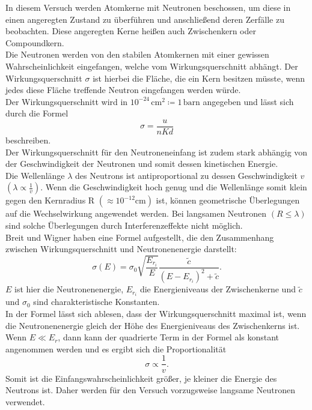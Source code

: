 In diesem Versuch werden Atomkerne mit Neutronen beschossen, um diese in einen angeregten Zustand zu überführen
und anschließend deren Zerfälle zu beobachten. Diese angeregten Kerne heißen auch Zwischenkern oder Compoundkern.\\
Die Neutronen werden von den stabilen Atomkernen mit einer gewissen Wahrscheinlichkeit eingefangen, welche vom 
Wirkungsquerschnitt abhängt. Der Wirkungsquerschnitt $\sigma$ ist hierbei die Fläche, die ein Kern besitzen müsste, 
wenn jedes diese Fläche treffende Neutron eingefangen werden würde.\\
Der Wirkungsquerschnitt wird in $10^{-24} \, \si{\centi\metre\squared} \coloneqq 1 \, \mathrm{barn}$ angegeben und
lässt sich durch die Formel
\begin{equation}
    \label{eqn:Sigma}
    \sigma = \frac{u}{nKd}
\end{equation}
beschreiben.\\
Der Wirkungsquerschnitt für den Neutroneneinfang ist zudem stark abhängig von der Geschwindigkeit der Neutronen und
somit dessen kinetischen Energie. \\
Die Wellenlänge $\lambda$ des Neutrons ist antiproportional zu dessen Geschwindigkeit $v$ $ \left(\lambda \propto \frac{1}{v}\right)$.
Wenn die Geschwindigkeit hoch genug und die Wellenlänge somit klein gegen den Kernradius R $\left(\approx 10^{-12} \si{\centi\metre}\right)$ ist,
können geometrische Überlegungen auf die Wechselwirkung angewendet werden. Bei langsamen Neutronen $\left(R \leq \lambda\right)$ sind solche
Überlegungen durch Interferenzeffekte nicht möglich.\\
Breit und Wigner haben eine Formel aufgestellt, die den Zusammenhang zwischen Wirkungsquerschnitt und Neutronenenergie
darstellt:
\begin{equation}
    \label{eqn:SigmaE}
    \sigma (E) = \sigma_0 \sqrt{\frac{E_{r_i}}{E}} \frac{\tilde{c}}{(E - E_{r_i})^2 + \tilde{c}} .
\end{equation}
$E$ ist hier die Neutronenenergie, $E_{r_i}$ die Energieniveaus der Zwischenkerne und $\tilde{c}$ und $\sigma_0$ sind charakteristische Konstanten.\\
In der Formel lässt sich ablesen, dass der Wirkungsquerschnitt maximal ist, wenn die Neutronenenergie gleich der Höhe des Energieniveaus
des Zwischenkerns ist.\\
Wenn $E \ll E_r$, dann kann der quadrierte Term in der Formel als konstant angenommen werden und es ergibt sich die Proportionalität
\begin{equation*}
    \sigma \propto \frac{1}{v}.
\end{equation*}
Somit ist die Einfangswahrscheinlichkeit größer, je kleiner die Energie des Neutrons ist. Daher werden für den Versuch vorzugsweise
langsame Neutronen verwendet.\\

